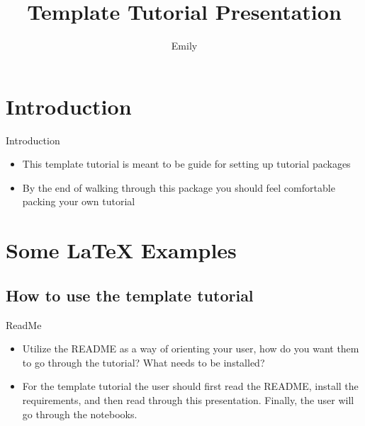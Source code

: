 \documentclass{beamer}
\title[Template Tutorial Presentation]{Template Tutorial Presentation}
\author{Emily}
\begin{document}
\begin{frame}
  \titlepage
\end{frame}


\section{Introduction}

\begin{frame}{Introduction}

\begin{itemize}
  \item This template tutorial is meant to be guide for setting up tutorial packages 
  \item By the end of walking through this package you should feel comfortable packing your own tutorial  
\end{itemize}


\end{frame}

\section{Some \LaTeX{} Examples}

\subsection{How to use the template tutorial}

\begin{frame}{ReadMe}

\begin{itemize}
  \item Utilize the README as a way of orienting your user, how do you want them to go through the tutorial? What needs to be installed?
  \item For the template tutorial the user should first read the README, install the requirements, and then read through this presentation. Finally, the user will go through the notebooks.
\end{itemize}

\end{frame}
\end{document}
